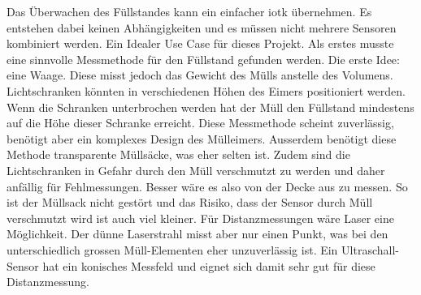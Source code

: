 Das Überwachen des Füllstandes kann ein einfacher \gls{iotk} übernehmen. Es entstehen dabei keinen Abhängigkeiten und es müssen nicht mehrere Sensoren kombiniert werden. Ein Idealer Use Case für dieses Projekt. Als erstes musste eine sinnvolle Messmethode für den Füllstand gefunden werden. Die erste Idee: eine Waage. Diese misst jedoch das Gewicht des Mülls anstelle des Volumens. Lichtschranken könnten in verschiedenen Höhen des Eimers positioniert werden. Wenn die Schranken unterbrochen werden hat der Müll den Füllstand mindestens auf die Höhe dieser Schranke erreicht. Diese Messmethode scheint zuverlässig, benötigt aber ein komplexes Design des Mülleimers. Ausserdem benötigt diese Methode transparente Müllsäcke, was eher selten ist. Zudem sind die Lichtschranken in Gefahr durch den Müll verschmutzt zu werden und daher anfällig für Fehlmessungen. Besser wäre es also von der Decke aus zu messen. So ist der Müllsack nicht gestört und das Risiko, dass der Sensor durch Müll verschmutzt wird ist auch viel kleiner. Für Distanzmessungen wäre Laser eine Möglichkeit. Der dünne Laserstrahl misst aber nur einen Punkt, was bei den unterschiedlich grossen Müll-Elementen eher unzuverlässig ist. Ein Ultraschall-Sensor hat ein konisches Messfeld und eignet sich damit sehr gut für diese Distanzmessung. 

